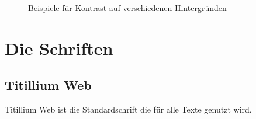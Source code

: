 \documentclass{article}
\begin{document}
\begin{figure}[H]
\begin{centering}
\hfill
{}
\hfill

\hfill
{}
\hfill
\end{centering}
\caption{Beispiele für Kontrast auf verschiedenen Hintergründen}
\end{figure}

\section{Die Schriften}

\begin{samepage}
\subsection{Titillium Web}

Titillium Web ist die Standardschrift die für alle Texte genutzt wird.
\end{samepage}
\end{document}
